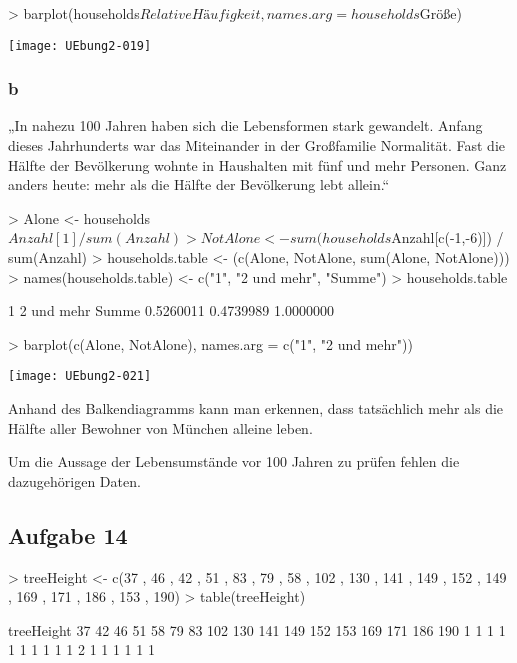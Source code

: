 \documentclass{article}
\begin{document}
\begin{Schunk}
\begin{Sinput}
> barplot(households$RelativeHäufigkeit, names.arg = households$Größe)
\end{Sinput}
\end{Schunk}
\texttt{[image: UEbung2-019]}

\subsubsection{b}

„In nahezu 100 Jahren haben sich die Lebensformen stark gewandelt. 
Anfang dieses Jahrhunderts war das Miteinander in der Großfamilie Normalität. 
Fast die Hälfte der Bevölkerung wohnte in Haushalten mit fünf und mehr Personen. 
Ganz anders heute: mehr als die Hälfte der Bevölkerung lebt allein.“

\begin{Schunk}
\begin{Sinput}
> Alone <- households$Anzahl[1] / sum(Anzahl)
> NotAlone <- sum(households$Anzahl[c(-1,-6)])  / sum(Anzahl)
> households.table <- (c(Alone, NotAlone, sum(Alone, NotAlone)))
> names(households.table) <- c("1", "2 und mehr", "Summe")
> households.table
\end{Sinput}
\begin{Soutput}
         1 2 und mehr      Summe 
 0.5260011  0.4739989  1.0000000 
\end{Soutput}
\end{Schunk}
\begin{Schunk}
\begin{Sinput}
> barplot(c(Alone, NotAlone), names.arg = c("1", "2 und mehr"))
\end{Sinput}
\end{Schunk}
\texttt{[image: UEbung2-021]}


Anhand des Balkendiagramms kann man erkennen, 
dass tatsächlich mehr als die Hälfte aller Bewohner von München alleine leben.

Um die Aussage der Lebensumstände vor 100 Jahren zu prüfen fehlen die dazugehörigen Daten.

\subsection{Aufgabe 14}

\begin{Schunk}
\begin{Sinput}
> treeHeight <- c(37 , 46 , 42 , 51 , 83 , 79 , 58 , 102 , 130 , 141 , 149 , 152 , 149 , 169 , 171 , 186 , 153 , 190)
> table(treeHeight)
\end{Sinput}
\begin{Soutput}
treeHeight
 37  42  46  51  58  79  83 102 130 141 149 152 153 169 171 186 190 
  1   1   1   1   1   1   1   1   1   1   2   1   1   1   1   1   1 
\end{Soutput}
\end{Schunk}
\end{document}

